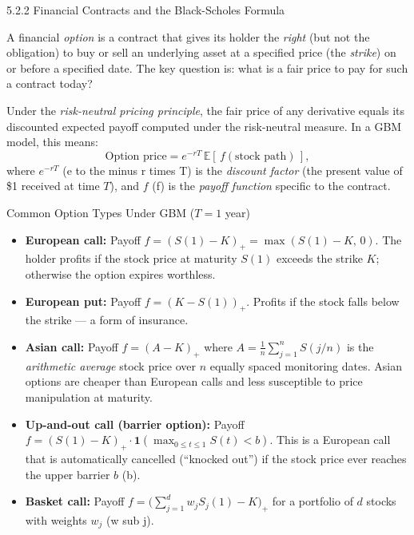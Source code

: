 \documentclass[aspectratio=169,10pt]{beamer}
\begin{document}
\begin{frame}[allowframebreaks]{5.2.2 Financial Contracts and the Black-Scholes Formula}

A financial \emph{option} is a contract that gives its holder the \emph{right}
(but not the obligation) to buy or sell an underlying asset at a specified price
(the \emph{strike}) on or before a specified date.  The key question is: what
is a fair price to pay for such a contract today?

Under the \emph{risk-neutral pricing principle}, the fair price of any
derivative equals its discounted expected payoff computed under the risk-neutral
measure.  In a GBM model, this means:
\[
  \text{Option price} = e^{-rT}\,\mathbb{E}[\,f(\text{stock path})\,],
\]
where $e^{-rT}$ (e to the minus r times T) is the \emph{discount factor}
(the present value of \$1 received at time $T$), and $f$ (f) is the
\emph{payoff function} specific to the contract.

\begin{block}{Common Option Types Under GBM ($T = 1$ year)}
  \begin{itemize}
    \item \textbf{European call:} Payoff $f = (S(1) - K)_+ = \max(S(1) - K,\, 0)$.
          The holder profits if the stock price at maturity $S(1)$ exceeds the
          strike $K$; otherwise the option expires worthless.
    \item \textbf{European put:} Payoff $f = (K - S(1))_+$.
          Profits if the stock falls below the strike --- a form of insurance.
    \item \textbf{Asian call:} Payoff $f = (A - K)_+$ where
          $A = \frac{1}{n}\sum_{j=1}^{n} S(j/n)$ is the \emph{arithmetic average}
          stock price over $n$ equally spaced monitoring dates.
          Asian options are cheaper than European calls and less susceptible to
          price manipulation at maturity.
    \item \textbf{Up-and-out call (barrier option):}
          Payoff $f = (S(1)-K)_+\cdot\mathbf{1}(\max_{0\le t\le 1}S(t) < b)$.
          This is a European call that is automatically cancelled (``knocked out'')
          if the stock price ever reaches the upper barrier $b$ (b).
    \item \textbf{Basket call:} Payoff $f = \bigl(\sum_{j=1}^d w_j S_j(1) - K\bigr)_+$
          for a portfolio of $d$ stocks with weights $w_j$ (w sub j).
  \end{itemize}
\end{block}


\end{frame}
\end{document}
